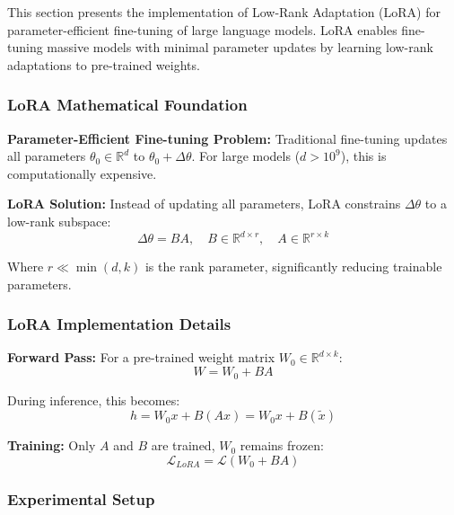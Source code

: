 \documentclass[conference]{IEEEtran}
\begin{document}
This section presents the implementation of Low-Rank Adaptation (LoRA) for parameter-efficient fine-tuning of large language models. LoRA enables fine-tuning massive models with minimal parameter updates by learning low-rank adaptations to pre-trained weights.

\subsubsection{LoRA Mathematical Foundation}
\label{sec:q3_lora_theory}

\textbf{Parameter-Efficient Fine-tuning Problem:}
Traditional fine-tuning updates all parameters $\theta_0 \in \mathbb{R}^d$ to $\theta_0 + \Delta\theta$. For large models ($d > 10^9$), this is computationally expensive.

\textbf{LoRA Solution:}
Instead of updating all parameters, LoRA constrains $\Delta\theta$ to a low-rank subspace:
\begin{equation}
\Delta\theta = B A, \quad B \in \mathbb{R}^{d \times r}, \quad A \in \mathbb{R}^{r \times k}
\end{equation}

Where $r \ll \min(d, k)$ is the rank parameter, significantly reducing trainable parameters.

\subsubsection{LoRA Implementation Details}
\label{sec:q3_lora_implementation}

\textbf{Forward Pass:}
For a pre-trained weight matrix $W_0 \in \mathbb{R}^{d \times k}$:
\begin{equation}
W = W_0 + B A
\end{equation}

During inference, this becomes:
\begin{equation}
h = W_0 x + B (A x) = W_0 x + B (\tilde{x})
\end{equation}

\textbf{Training:}
Only $A$ and $B$ are trained, $W_0$ remains frozen:
\begin{equation}
\mathcal{L}_{LoRA} = \mathcal{L}(W_0 + B A)
\end{equation}

\subsubsection{Experimental Setup}
\label{sec:q3_experiments}
\end{document}
